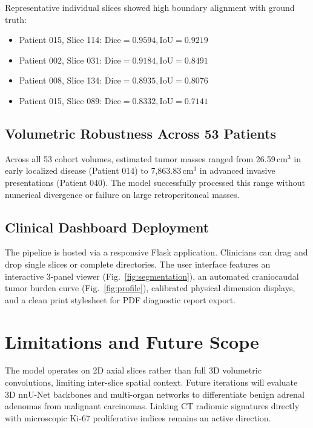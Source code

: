 \documentclass[conference]{IEEEtran}
\begin{document}
Representative individual slices showed high boundary alignment with ground truth:
\begin{itemize}
    \item Patient 015, Slice 114: $\text{Dice} = 0.9594, \text{IoU} = 0.9219$
    \item Patient 002, Slice 031: $\text{Dice} = 0.9184, \text{IoU} = 0.8491$
    \item Patient 008, Slice 134: $\text{Dice} = 0.8935, \text{IoU} = 0.8076$
    \item Patient 015, Slice 089: $\text{Dice} = 0.8332, \text{IoU} = 0.7141$
\end{itemize}

\subsection{Volumetric Robustness Across 53 Patients}
Across all 53 cohort volumes, estimated tumor masses ranged from 26.59\,cm$^3$ in early localized disease (Patient 014) to 7,863.83\,cm$^3$ in advanced invasive presentations (Patient 040). The model successfully processed this range without numerical divergence or failure on large retroperitoneal masses.

\subsection{Clinical Dashboard Deployment}
The pipeline is hosted via a responsive Flask application. Clinicians can drag and drop single slices or complete directories. The user interface features an interactive 3-panel viewer (Fig.~\ref{fig:segmentation}), an automated craniocaudal tumor burden curve (Fig.~\ref{fig:profile}), calibrated physical dimension displays, and a clean print stylesheet for PDF diagnostic report export.

\section{Limitations and Future Scope}
The model operates on 2D axial slices rather than full 3D volumetric convolutions, limiting inter-slice spatial context. Future iterations will evaluate 3D nnU-Net backbones \cite{isensee2021} and multi-organ networks \cite{gibson2018} to differentiate benign adrenal adenomas from malignant carcinomas. Linking CT radiomic signatures directly with microscopic Ki-67 proliferative indices remains an active direction.
\end{document}
